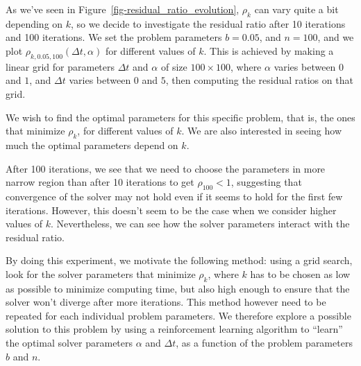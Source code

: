 \documentclass[
  letterpaper,
]{report}
\theoremstyle{definition}
\theoremstyle{plain}
\theoremstyle{definition}
\theoremstyle{remark}
\begin{document}
As we've seen in Figure~\ref{fig-residual_ratio_evolution}, \(\rho_k\)
can vary quite a bit depending on \(k\), so we decide to investigate the
residual ratio after 10 iterations and 100 iterations. We set the
problem parameters \(b = 0.05\), and \(n = 100\), and we plot
\(\rho_{k,0.05,100}(\Delta t, \alpha)\) for different values of \(k\).
This is achieved by making a linear grid for parameters \(\Delta t\) and
\(\alpha\) of size \(100\times 100\), where \(\alpha\) varies between
\(0\) and \(1\), and \(\Delta t\) varies between \(0\) and \(5\), then
computing the residual ratios on that grid.

We wish to find the optimal parameters for this specific problem, that
is, the ones that minimize \(\rho_{k}\), for different values of \(k\).
We are also interested in seeing how much the optimal parameters depend
on \(k\).

After 100 iterations, we see that we need to choose the parameters in
more narrow region than after 10 iterations to get \(\rho_{100}<1\),
suggesting that convergence of the solver may not hold even if it seems
to hold for the first few iterations. However, this doesn't seem to be
the case when we consider higher values of \(k\). Nevertheless, we can
see how the solver parameters interact with the residual ratio.

By doing this experiment, we motivate the following method: using a grid
search, look for the solver parameters that minimize \(\rho_k\), where
\(k\) has to be chosen as low as possible to minimize computing time,
but also high enough to ensure that the solver won't diverge after more
iterations. This method however need to be repeated for each individual
problem parameters. We therefore explore a possible solution to this
problem by using a reinforcement learning algorithm to ``learn'' the
optimal solver parameters \(\alpha\) and \(\Delta t\), as a function of
the problem parameters \(b\) and \(n\).
\end{document}
